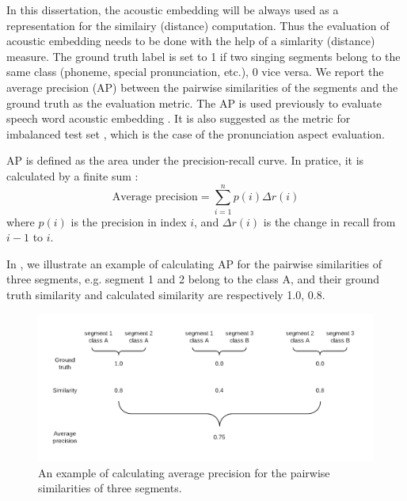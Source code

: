 In this dissertation, the acoustic embedding will be always used as a representation for the similairy (distance) computation. Thus the evaluation of acoustic embedding needs to be done with the help of a simlarity (distance) measure. The ground truth label is set to 1 if two singing segments belong to the same class (phoneme, special pronunciation, etc.), 0 vice versa. We report the average precision (AP) between the pairwise similarities of the segments and the ground truth as the evaluation metric. The AP is used previously to evaluate speech word acoustic embedding \cite{Kampera,Settle2016a}. It is also suggested as the metric for imbalanced test set \cite{Davis2006}, which is the case of the pronunciation aspect evaluation.

AP is defined as the area under the precision-recall curve. In pratice, it is calculated by a finite sum :
\begin{equation}
\textrm{Average precision} = \sum_{i=1}^{n} p(i)\Delta r(i)
\end{equation} 
where $p(i)$ is the precision in index $i$, and  $\Delta r(i)$ is the change in recall from $i-1$ to $i$.

In , we illustrate an example of calculating AP for the pairwise similarities of three segments, e.g. segment 1 and 2 belong to the class A, and their ground truth similarity and calculated similarity are respectively 1.0, 0.8.

\begin{figure}[ht!]
\includegraphics[width=\textwidth]{figs/blockDiags_rong/ch2_average_precision.png}
\caption{An example of calculating average precision for the pairwise similarities of three segments.}
\label{fig:ch2_average_precision}
\end{figure}